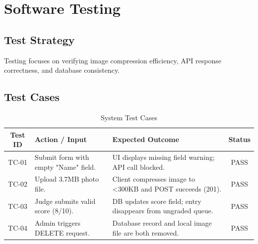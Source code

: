 \chapter{Software Testing}

\section{Test Strategy}
Testing focuses on verifying image compression efficiency, API response correctness, and database consistency.

\section{Test Cases}
\begin{table}[h!]
\centering
\renewcommand{\arraystretch}{1.3}
\begin{tabular}{|c|p{4.5cm}|p{4.5cm}|c|}
\hline
\textbf{Test ID} & \textbf{Action / Input} & \textbf{Expected Outcome} & \textbf{Status} \\ \hline
TC-01 & Submit form with empty "Name" field. & UI displays missing field warning; API call blocked. & PASS \\ \hline
TC-02 & Upload 3.7MB photo file. & Client compresses image to <300KB and POST succeeds (201). & PASS \\ \hline
TC-03 & Judge submits valid score (8/10). & DB updates score field; entry disappears from ungraded queue. & PASS \\ \hline
TC-04 & Admin triggers DELETE request. & Database record and local image file are both removed. & PASS \\ \hline
\end{tabular}
\caption{System Test Cases}
\end{table}